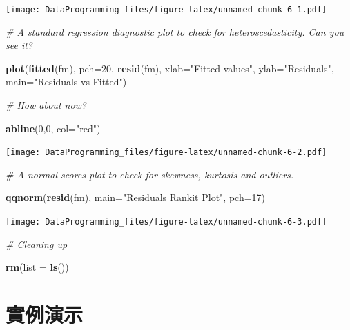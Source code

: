 \documentclass[]{book}
\newenvironment{Shaded}{\begin{snugshade}}{\end{snugshade}}
\newcommand{\CommentTok}[1]{\textcolor[rgb]{0.56,0.35,0.01}{\textit{#1}}}
\newcommand{\DataTypeTok}[1]{\textcolor[rgb]{0.13,0.29,0.53}{#1}}
\newcommand{\DecValTok}[1]{\textcolor[rgb]{0.00,0.00,0.81}{#1}}
\newcommand{\KeywordTok}[1]{\textcolor[rgb]{0.13,0.29,0.53}{\textbf{#1}}}
\newcommand{\NormalTok}[1]{#1}
\newcommand{\StringTok}[1]{\textcolor[rgb]{0.31,0.60,0.02}{#1}}
\begin{document}
\texttt{[image: DataProgramming\_files/figure-latex/unnamed-chunk-6-1.pdf]}

\begin{Shaded}
\begin{Highlighting}[]
\CommentTok{# A standard regression diagnostic plot to check for heteroscedasticity. Can you see it?}

\KeywordTok{plot}\NormalTok{(}\KeywordTok{fitted}\NormalTok{(fm), }\DataTypeTok{pch=}\DecValTok{20}\NormalTok{, }\KeywordTok{resid}\NormalTok{(fm), }\DataTypeTok{xlab=}\StringTok{"Fitted values"}\NormalTok{, }\DataTypeTok{ylab=}\StringTok{"Residuals"}\NormalTok{, }\DataTypeTok{main=}\StringTok{"Residuals vs Fitted"}\NormalTok{)}

\CommentTok{# How about now?}

\KeywordTok{abline}\NormalTok{(}\DecValTok{0}\NormalTok{,}\DecValTok{0}\NormalTok{, }\DataTypeTok{col=}\StringTok{"red"}\NormalTok{)  }
\end{Highlighting}
\end{Shaded}

\texttt{[image: DataProgramming\_files/figure-latex/unnamed-chunk-6-2.pdf]}

\begin{Shaded}
\begin{Highlighting}[]
\CommentTok{# A normal scores plot to check for skewness, kurtosis and outliers.}

\KeywordTok{qqnorm}\NormalTok{(}\KeywordTok{resid}\NormalTok{(fm), }\DataTypeTok{main=}\StringTok{"Residuals Rankit Plot"}\NormalTok{, }\DataTypeTok{pch=}\DecValTok{17}\NormalTok{)}
\end{Highlighting}
\end{Shaded}

\texttt{[image: DataProgramming\_files/figure-latex/unnamed-chunk-6-3.pdf]}

\begin{Shaded}
\begin{Highlighting}[]
\CommentTok{# Cleaning up}

\KeywordTok{rm}\NormalTok{(}\DataTypeTok{list =} \KeywordTok{ls}\NormalTok{())}
\end{Highlighting}
\end{Shaded}

\hypertarget{section-4}{%
\section{實例演示}\label{section-4}}
\end{document}
